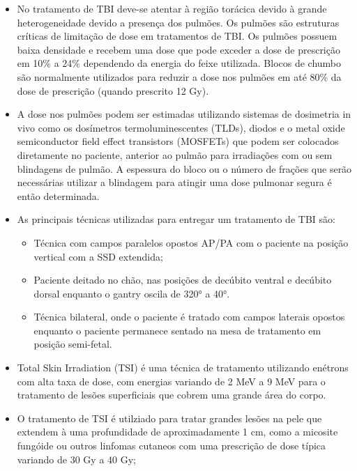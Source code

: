 \documentclass[11pt,a4paper]{article}
\newcounter{exemplo}
\begin{document}
\begin{exemplo}
\begin{itemize}
        \item No tratamento de TBI deve-se atentar à região torácica devido à grande heterogeneidade devido a presença dos pulmões. Os pulmões são estruturas críticas de limitação de dose em tratamentos de TBI. Os pulmões possuem baixa densidade e recebem uma dose que pode exceder a dose de prescrição em 10\% a 24\% dependendo da energia do feixe utilizada. Blocos de chumbo são normalmente utilizados para reduzir a dose nos pulmões em até 80\% da dose de prescrição (quando prescrito 12 Gy).
        
        \item A dose nos pulmões podem ser estimadas utilizando sistemas de dosimetria in vivo como os dosímetros termoluminescentes (TLDs), diodos e o metal oxide semiconductor field effect transistors (MOSFETs) que podem ser colocados diretamente no paciente, anterior ao pulmão para irradiações com ou sem blindagens de pulmão. A espessura do bloco ou o número de frações que serão necessárias utilizar a blindagem para atingir uma dose pulmonar segura é então determinada.
        
        \item As principais técnicas utilizadas para entregar um tratamento de TBI são:
        
            \begin{itemize}[label=\textcolor{CarnationPink}{$\blacktriangleright$}]
                \item Técnica com campos paralelos opostos AP/PA com o paciente na posição vertical com a SSD extendida;
                \item Paciente deitado no chão, nas posições de decúbito ventral e decúbito dorsal enquanto o gantry oscila de \ang{320} a \ang{40}.
                \item Técnica bilateral, onde o paciente é tratado com campos laterais opostos enquanto o paciente permanece sentado na mesa de tratamento em posição semi-fetal.
            \end{itemize}

        \item Total Skin Irradiation (TSI) é uma técnica de tratamento utilizando enétrons com alta taxa de dose, com energias variando de 2 MeV a 9 MeV para o tratamento de lesões superficiais que cobrem uma grande área do corpo.
        
        \item O tratamento de TSI é utilziado para tratar grandes lesões na pele que extendem à uma profundidade de aproximadamente 1 cm, como a micosite fungóide ou outros linfomas cutaneos com uma prescrição de dose típica variando de 30 Gy a 40 Gy;
        

\end{itemize}
\end{exemplo}
\end{document}
